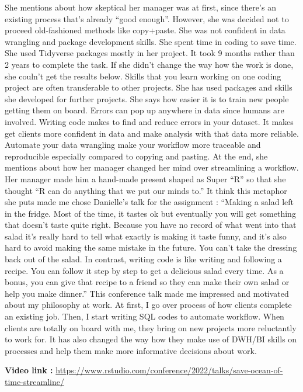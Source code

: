 \documentclass[
  letterpaper,
  DIV=11,
  numbers=noendperiod]{scrreprt}
\begin{document}
She mentions about how skeptical her manager was at first, since there's
an existing process that's already ``good enough''. However, she was
decided not to proceed old-fashioned methods like copy+paste. She was
not confident in data wrangling and package development skills. She
spent time in coding to save time. She used Tidyverse packages mostly in
her project. It took 9 months rather than 2 years to complete the task.
If she didn't change the way how the work is done, she couln't get the
results below. Skills that you learn working on one coding project are
often transferable to other projects. She has used packages and skills
she developed for further projects. She says how easier it is to train
new people getting them on board. Errors can pop up anywhere in data
since humans are involved. Writing code makes to find and reduce errors
in your dataset. It makes get clients more confident in data and make
analysis with that data more reliable. Automate your data wrangling make
your workflow more traceable and reproducible especially compared to
copying and pasting. At the end, she mentions about how her manager
changed her mind over streamlining a workflow. Her manager made him a
hand-made present shaped as Super ``R'' so that she thought ``R can do
anything that we put our minds to.'' It think this metaphor she puts
made me chose Danielle's talk for the assignment : ``Making a salad left
in the fridge. Most of the time, it tastes ok but eventually you will
get something that doesn't taste quite right. Because you have no record
of what went into that salad it's really hard to tell what exactly is
making it taste funny, and it's also hard to avoid making the same
mistake in the future. You can't take the dressing back out of the
salad. In contrast, writing code is like writing and following a recipe.
You can follow it step by step to get a delicious salad every time. As a
bonus, you can give that recipe to a friend so they can make their own
salad or help you make dinner.'' This conference talk made me impressed
and motivated about my philosophy at work. At first, I go over process
of how clients complete an existing job. Then, I start writing SQL codes
to automate workflow. When clients are totally on board with me, they
bring on new projects more reluctantly to work for. It has also changed
the way how they make use of DWH/BI skills on processes and help them
make more informative decisions about work.

\textbf{Video link :}
\url{https://www.rstudio.com/conference/2022/talks/save-ocean-of-time-streamline/}
\end{document}
